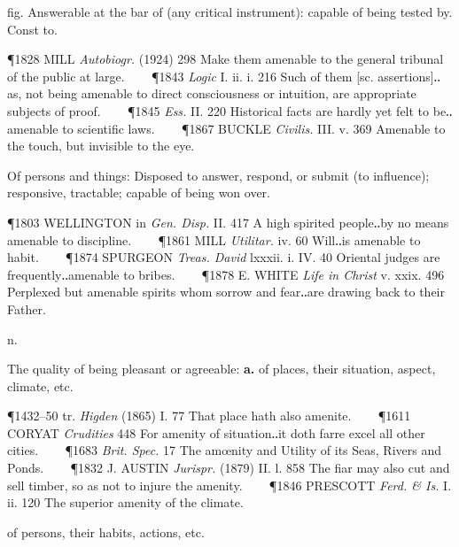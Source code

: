 \begin{description}[wide, labelwidth=!, labelindent=0pt]
\begin{myenumerate}
 fig. Answerable at the bar of (any critical instrument): capable of being tested by. Const to. 

\P 1828 MILL \textit{Autobiogr.} (1924) 298 Make them amenable to the general tribunal of the public at large.    
\P 1843 \textit{Logic} I. ii. i. 216 Such of them [sc. assertions]‥as, not being amenable to direct consciousness or intuition, are appropriate subjects of proof.    
\P 1845 \textit{Ess.} II. 220 Historical facts are hardly yet felt to be‥amenable to scientific laws.    
\P 1867 BUCKLE \textit{Civilis.} III. v. 369 Amenable to the touch, but invisible to the eye.

 Of persons and things: Disposed to answer, respond, or submit (to influence); responsive, tractable; capable of being won over. 

\P 1803 WELLINGTON in \textit{Gen. Disp.} II. 417 A high spirited people‥by no means amenable to discipline.    
\P 1861 MILL \textit{Utilitar.} iv. 60 Will‥is amenable to habit.    
\P 1874 SPURGEON \textit{Treas. David} lxxxii. i. IV. 40 Oriental judges are frequently‥amenable to bribes.    
\P 1878 E. WHITE \textit{Life in Christ} v. xxix. 496 Perplexed but amenable spirits whom sorrow and fear‥are drawing back to their Father.
\end{myenumerate}

  n.

\noindent  {}

\vspace{-0.3cm}

\begin{myenumerate}
 The quality of being pleasant or agreeable: \textbf{a.} of places, their situation, aspect, climate, etc. 

\P 1432–50 tr. \textit{Higden} (1865) I. 77 That place hath also amenite.    
\P 1611 CORYAT \textit{Crudities} 448 For amenity of situation‥it doth farre excel all other cities.    
\P 1683 \textit{Brit. Spec.} 17 The amœnity and Utility of its Seas, Rivers and Ponds.    
\P 1832 J. AUSTIN \textit{Jurispr.} (1879) II. l. 858 The fiar may also cut and sell timber, so as not to injure the amenity.    
\P 1846 PRESCOTT \textit{Ferd. \& Is.} I. ii. 120 The superior amenity of the climate.

 of persons, their habits, actions, etc. 


\end{myenumerate}
\end{description}
